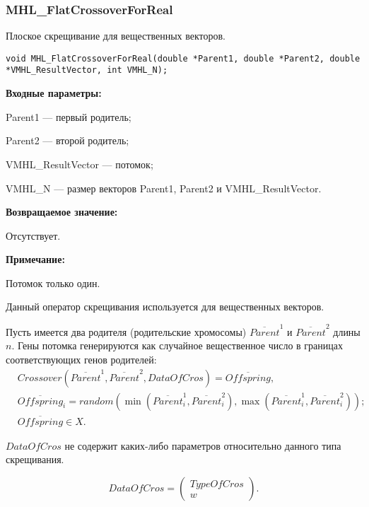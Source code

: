 \documentclass[a4paper,12pt]{article}
\begin{document}
\subsubsection{MHL\_FlatCrossoverForReal}\label{MHL_FlatCrossoverForReal}

Плоское скрещивание для вещественных векторов.


\begin{lstlisting}[label=code_syntax_MHL_FlatCrossoverForReal,caption=Синтаксис]
void MHL_FlatCrossoverForReal(double *Parent1, double *Parent2, double *VMHL_ResultVector, int VMHL_N);
\end{lstlisting}

\textbf{Входные параметры:}
 
Parent1 --- первый родитель;
 
Parent2 --- второй родитель;
 
VMHL\_ResultVector --- потомок;

 
VMHL\_N --- размер векторов Parent1, Parent2 и VMHL\_ResultVector.

\textbf{Возвращаемое значение:}

 Отсутствует.
 
\textbf{ Примечание:}

 Потомок только один.
 
Данный оператор скрещивания используется для вещественных векторов.

Пусть имеется два родителя (родительские хромосомы) $ \overline{Parent}^1 $ и $ \overline{Parent}^2$ длины $n$. Гены потомка генерируются как случайное вещественное число в границах соответствующих генов родителей:
\begin{align}
\label{SetOfOperatorsAlgorithms:eq:FlatCrossoverForReal}
&Crossover \left( \overline{Parent}^1, \overline{Parent}^2, DataOfCros\right)= \overline{Offspring}, \\
& \overline{Offspring}_i=random\left(\min\left(\overline{Parent}^1_i, \overline{Parent}^2_i \right),\max\left(\overline{Parent}^1_i, \overline{Parent}^2_i \right)  \right);\nonumber\\
&\overline{Offspring}\in X.\nonumber
\end{align}

$ DataOfCros $ не содержит каких-либо параметров относительно данного типа скрещивания.

\begin{equation}
DataOfCros=\left( \begin{array}{c} TypeOfCros \\ w \end{array} \right).
\end{equation}
\end{document}
